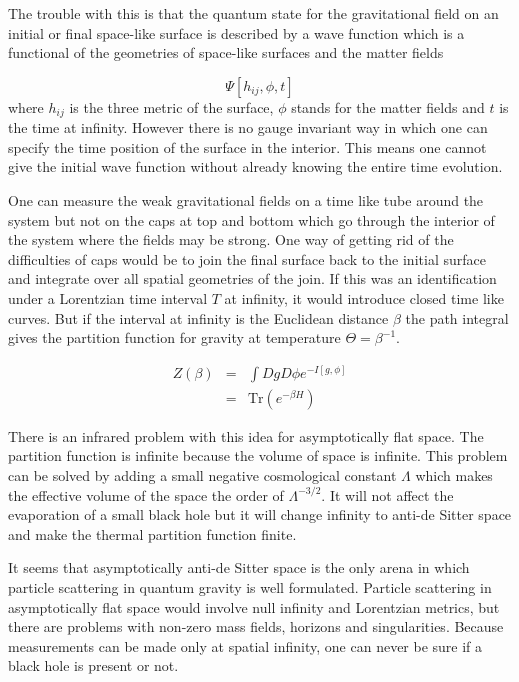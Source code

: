 \documentclass[aps,prd,groupedaddress,showpacs,12pt,nofootinbib]{revtex4-1}
\begin{document}
The trouble with this is that the quantum state for the gravitational field on an initial or final space-like surface is described by a wave function which is a functional of the geometries of space-like surfaces and the matter fields 

\begin{equation}
\Psi[h_{ij}, \phi, t]
\end{equation}
where $h_{ij}$ is the three metric of the surface, $\phi$ stands for the matter fields and $t$ is the time at infinity. 
However there is no gauge invariant way in which one can specify the time position of the surface in the interior. This means one cannot give the initial wave function without already knowing the entire time evolution. 

One can measure the weak gravitational fields on a time like tube around the system but not on the caps at top and bottom which go through the interior of the system where the fields may be strong. One way of getting rid of the difficulties of caps would be to join the final surface back to the initial surface and integrate over all spatial geometries of the join.   If this was an identification under a Lorentzian time interval $T$ at infinity, it would introduce closed time like curves. But if the interval at infinity is the Euclidean  distance $\beta$ the path integral gives the partition function for gravity at temperature $\Theta=\beta^{-1}$.  

\begin{eqnarray}
Z(\beta)&=&\int DgD\phi e^{-I[g, \phi]}\nonumber \\
&=&\text{Tr}(e^{-\beta H})
\end{eqnarray}


There is an infrared problem with this idea for asymptotically flat space.  The partition function is infinite because the volume of space is infinite. This problem can be solved by adding a small negative cosmological constant $\Lambda$ which makes the effective volume of the space the order of $\Lambda^{-3/2}$. It will not affect the evaporation of a small black hole but it will change infinity to anti-de Sitter space and make the thermal partition function finite.

It seems that asymptotically anti-de Sitter space is the only arena in which particle scattering in quantum gravity is well formulated. Particle scattering in asymptotically flat space would involve null infinity and Lorentzian metrics, but there are problems with non-zero mass fields, horizons and singularities. Because measurements can be made only at spatial infinity, one can never be sure if a black hole is present or not. 
\end{document}
